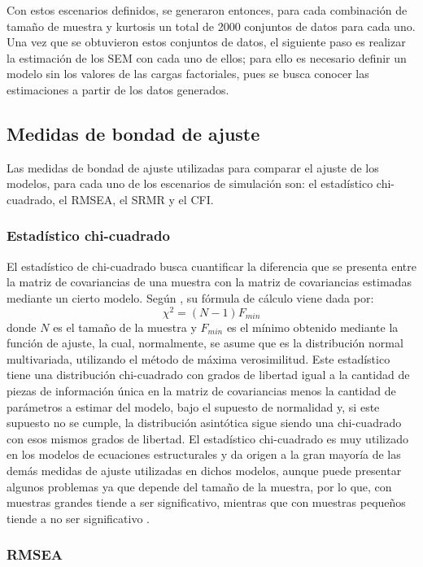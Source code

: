 \documentclass[english]{revcoles}
\begin{document}
Con estos escenarios definidos, se generaron entonces, para cada combinación de tamaño de muestra y kurtosis un total de 2000 conjuntos de datos para cada uno. Una vez que se obtuvieron estos conjuntos de datos, el siguiente paso es realizar la estimación de los SEM con cada uno de ellos; para ello es necesario definir un modelo sin los valores de las cargas factoriales, pues se busca conocer las estimaciones a partir de los datos generados.

\subsection{Medidas de bondad de ajuste}

Las medidas de bondad de ajuste utilizadas para comparar el ajuste de los modelos, para cada uno de los escenarios de simulación son: el estadístico chi-cuadrado, el RMSEA, el SRMR y el CFI.

\subsubsection{Estadístico chi-cuadrado}

El estadístico de chi-cuadrado busca cuantificar la diferencia que se presenta entre la matriz de covariancias de una muestra con la matriz de covariancias estimadas mediante un cierto modelo. Según , su fórmula de cálculo viene dada por:
\[
  \chi^2 = (N-1) F_{min}
\]
donde \(N\) es el tamaño de la muestra y \(F_{min}\) es el mínimo obtenido mediante la función de ajuste, la cual, normalmente, se asume que es la distribución normal multivariada, utilizando el método de máxima verosimilitud. Este estadístico tiene una distribución chi-cuadrado con grados de libertad igual a la cantidad de piezas de información única en la matriz de covariancias menos la cantidad de parámetros a estimar del modelo, bajo el supuesto de normalidad y, si este supuesto no se cumple, la distribución asintótica sigue siendo una chi-cuadrado con esos mismos grados de libertad. El estadístico chi-cuadrado es muy utilizado en los modelos de ecuaciones estructurales y da origen a la gran mayoría de las demás medidas de ajuste utilizadas en dichos modelos, aunque puede presentar algunos problemas ya que depende del tamaño de la muestra, por lo que, con muestras grandes tiende a ser significativo, mientras que con muestras pequeños tiende a no ser significativo \cite{Kenny2015}.

\subsubsection{RMSEA}
\end{document}
